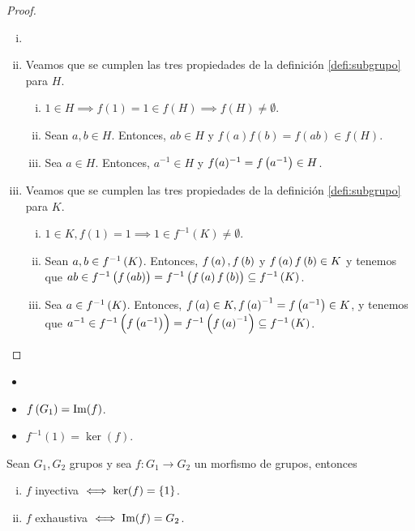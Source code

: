 \begin{proof}
    \begin{enumerate}[i)]
        \item[]
        \item Veamos que se cumplen las tres propiedades de la definición \ref{defi:subgrupo} para $H$.
        \begin{enumerate}[i)]
            \item $1 \in H \implies f(1) = 1 \in f(H) \implies f(H) \neq \emptyset$.
            \item Sean $a, b \in H$. Entonces, $ab \in H$ y $f(a) f(b) = f(ab) \in f(H)$.
            \item Sea $a \in H$. Entonces, $a^{-1} \in H$ y $f(a)^{-1} = f\left( a ^{-1}\right) \in H$.
        \end{enumerate}
        \item Veamos que se cumplen las tres propiedades de la definición \ref{defi:subgrupo} para $K$.
        \begin{enumerate}[i)]
            \item $1 \in K, f(1) = 1 \implies 1 \in f^{-1}(K) \neq \emptyset$.
            \item Sean $a, b \in f^{-1}\left( K\right)$. Entonces, $ f\left( a\right), f\left( b\right)$ y $ f\left( a\right) f\left( b\right) \in K$ y tenemos que $ab \in f^{-1}\left( f\left( ab\right) \right) = f^{-1}\left( f\left( a \right) f\left( b\right)\right) \subseteq f^{-1}\left( K\right)$.
            \item Sea $a \in f^{-1}\left( K\right)$. Entonces, $f\left( a\right)\in K, f\left( a\right)^{-1}=f\left( a^{-1}\right) \in K$, y tenemos que $a^{-1} \in f^{-1}\left( f\left( a^{-1}\right) \right) = f^{-1}\left( f\left( a \right) ^{-1} \right) \subseteq f^{-1}\left( K\right)$.
        \end{enumerate}
    \end{enumerate}
\end{proof}

\begin{obs}
    \begin{itemize}
        \item[]
        \item $f\left( G_1 \right) = \operatorname{Im}(f)$.
        \item $f^{-1}(1) = \ker(f)$.
    \end{itemize}
\end{obs}

\begin{prop} Sean $G_1, G_2$ grupos y sea $f\colon G_1\to G_2$ un morfismo de grupos, entonces
    \begin{enumerate}[i)]
        \item $f$ inyectiva $\iff \ker(f) = \left\{1\right\}$.
        \item $f$ exhaustiva $\iff \operatorname{Im}(f) = G_2$.
    \end{enumerate}
\end{prop}

